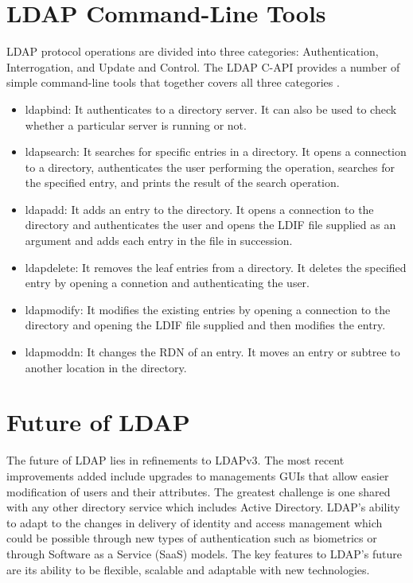 \documentclass[9pt,twocolumn,twoside]{../../styles/osajnl}
\begin{document}
\section{LDAP Command-Line Tools}
LDAP protocol operations are divided into three categories:
Authentication, Interrogation, and Update and Control.  The LDAP C-API
provides a number of simple command-line tools that together covers
all three categories \cite{www-ldap-commands}.
\begin{itemize}
\item ldapbind: It authenticates to a directory server. It can also be
  used to check whether a particular server is running or not.
\item ldapsearch: It searches for specific entries in a directory. It
  opens a connection to a directory, authenticates the user performing
  the operation, searches for the specified entry, and prints the
  result of the search operation.
\item ldapadd: It adds an entry to the directory. It opens a
  connection to the directory and authenticates the user and opens the
  LDIF file supplied as an argument and adds each entry in the file in
  succession.
\item ldapdelete: It removes the leaf entries from a directory. It
  deletes the specified entry by opening a connetion and
  authenticating the user.
\item ldapmodify: It modifies the existing entries by opening a
  connection to the directory and opening the LDIF file supplied and
  then modifies the entry.
\item ldapmoddn: It changes the RDN of an entry. It moves an entry or
  subtree to another location in the directory.
\end{itemize}

\section{Future of LDAP}
The future of LDAP lies in refinements to LDAPv3. The most recent
improvements added include upgrades to managements GUIs that allow
easier modification of users and their attributes. The greatest
challenge is one shared with any other directory service which
includes Active Directory. LDAP's ability to adapt to the changes in
delivery of identity and access management which could be possible
through new types of authentication such as biometrics or through
Software as a Service (SaaS) models. The key features to LDAP's future
are its ability to be flexible, scalable and adaptable with new
technologies. \cite{ldap-ibm-book}
\end{document}
